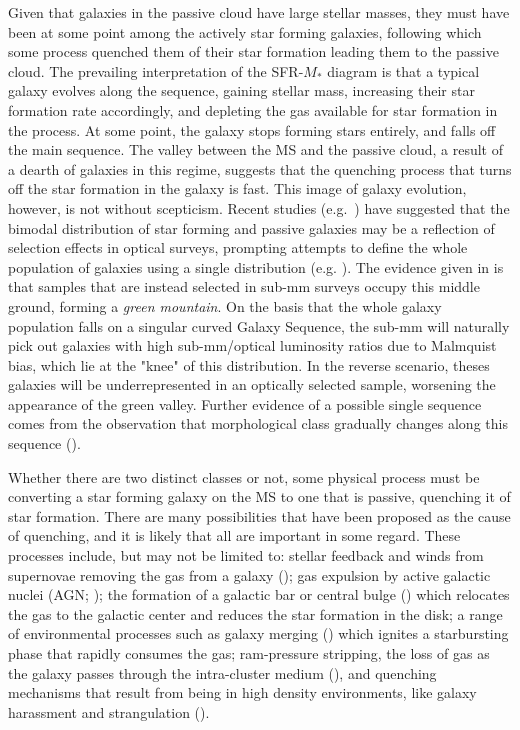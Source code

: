 Given that galaxies in the passive cloud have large stellar masses, they must have been at some point among the actively star forming galaxies, following which some process quenched them of their star formation leading them to the passive cloud. The prevailing interpretation of the SFR-$M_*$ diagram is that a typical galaxy evolves along the sequence, gaining stellar mass, increasing their star formation rate accordingly, and depleting the gas available for star formation in the process. At some point, the galaxy stops forming stars entirely, and falls off the main sequence. The valley between the MS and the passive cloud, a result of a dearth of galaxies in this regime, suggests that the quenching process that turns off the star formation in the galaxy is fast. This image of galaxy evolution, however, is not without scepticism. Recent studies \mbox{(e.g. \citealt{Eales_2018a, Bremer_2018, Phillipps_2019})} have suggested that the bimodal distribution of star forming and passive galaxies may be a reflection of selection effects in optical surveys, prompting attempts to define the whole population of galaxies using a single distribution (e.g. \citealt{Corcho-Caballero_2020}). The evidence given in \citealt{Eales_2018a} is that samples that are instead selected in sub-mm surveys occupy this middle ground, forming a \textit{green mountain}. On the basis that the whole galaxy population falls on a singular curved Galaxy Sequence, the sub-mm will naturally pick out galaxies with high sub-mm/optical luminosity ratios due to Malmquist bias, which lie at the "knee" of this distribution. In the reverse scenario, theses galaxies will be underrepresented in an optically selected sample, worsening the appearance of the green valley. Further evidence of a possible single sequence comes from the observation that morphological class gradually changes along this sequence (\citealt{Eales_2018b}).

Whether there are two distinct classes or not, some physical process must be converting a star forming galaxy on the MS to one that is passive, quenching it of star formation. There are many possibilities that have been proposed as the cause of quenching, and it is likely that all are important in some regard. These processes include, but may not be limited to: stellar feedback and winds from supernovae removing the gas from a galaxy (\citealt{Hayward_2017}); gas expulsion by active galactic nuclei (AGN; \citealt{Springel_2005, Croton_2006, Cicone_2014, Harrison_2017}); the formation of a galactic bar or central bulge (\citealt{Bournaud_2007, Martig_2009}) which relocates the gas to the galactic center and reduces the star formation in the disk; a range of environmental processes such as galaxy merging (\citealt{Lavery_1994, Weigel_2017}) which ignites a starbursting phase that rapidly consumes the gas; ram-pressure stripping, the loss of gas as the galaxy passes through the intra-cluster medium (\citealt{Gunn_1972, Boselli_2006, Domainko_2006, Boselli_2014}), and quenching mechanisms that result from being in high density environments, like galaxy harassment and strangulation (\citealt{Moore_1996, Moore_1998, Bekki_2002}).

